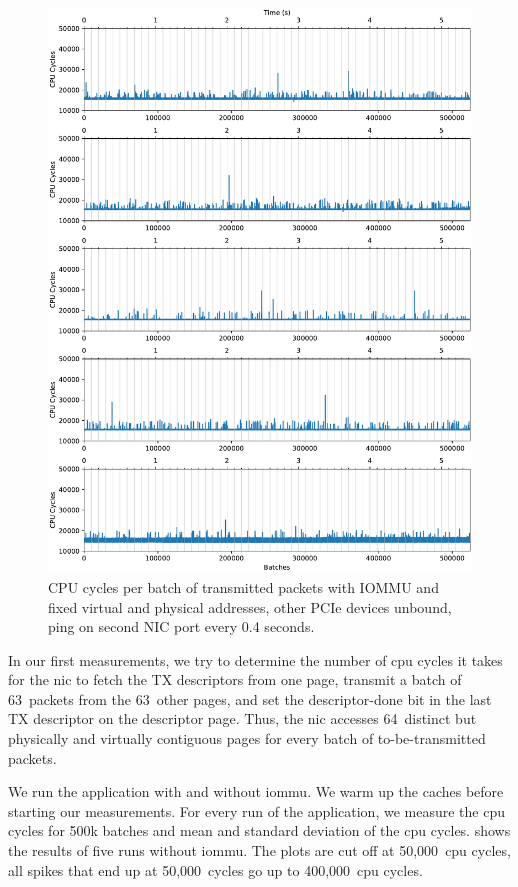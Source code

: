 \begin{figure}%
    \centering
    \includegraphics[width=1.0\textwidth]{figures/iotlb-baseline-iommu-pt-fixed-no-devs-ping-0.4}
    \caption{CPU cycles per batch of transmitted packets with IOMMU and fixed
    virtual and physical addresses, other PCIe devices unbound, ping on second
    NIC port every 0.4 seconds.}
    \label{fig:cycles-iommu-pt-fixed-no-devs-ping}
\end{figure}

In our first measurements, we try to determine the number of \ac{cpu} cycles it
takes for the \ac{nic} to fetch the TX descriptors from one page, transmit a
batch of 63~packets from the 63~other pages, and set the descriptor-done bit in
the last TX descriptor on the descriptor page. Thus, the \ac{nic} accesses
64~distinct but physically and virtually contiguous pages for every batch of
to-be-transmitted packets.

We run the application with and without \ac{iommu}. We warm up the caches before
starting our measurements. For every run of the application, we measure the
\ac{cpu} cycles for 500k batches and mean and standard deviation of the
\ac{cpu} cycles.  shows the results of five runs
without \ac{iommu}. The plots are cut off at 50,000~\ac{cpu} cycles, all spikes
that end up at 50,000~cycles go up to 400,000~\ac{cpu} cycles.

